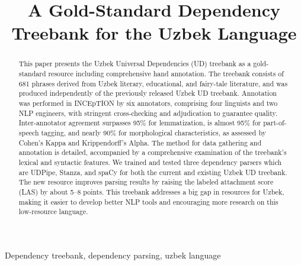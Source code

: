 \documentclass[10pt,conference,a4paper]{IEEEtran_EDM}
\def\confheader{}
\begin{document}
\markboth{\confheader}{}
\title{A Gold-Standard Dependency Treebank for the Uzbek Language}

\author{
\and
{}
}

\maketitle
\thispagestyle{plain}
\pagestyle{plain}

\begin{abstract}
 This paper presents the Uzbek Universal Dependencies (UD) treebank as a gold-standard resource including comprehensive hand annotation. The treebank consists of 681 phrases derived from Uzbek literary, educational, and fairy-tale literature, and was produced independently of the previously released Uzbek UD treebank. Annotation was performed in INCEpTION by six annotators, comprising four linguists and two NLP engineers, with stringent cross-checking and adjudication to guarantee quality. Inter-annotator agreement surpasses 95\% for lemmatization, is almost 95\% for part-of-speech tagging, and nearly 90\% for morphological characteristics, as assessed by Cohen's Kappa and Krippendorff's Alpha. The method for data gathering and annotation is detailed, accompanied by a comprehensive examination of the treebank's lexical and syntactic features. We trained and tested three dependency parsers which are UDPipe, Stanza, and spaCy for both the current and existing Uzbek UD treebank. The new resource improves parsing results by raising the labeled attachment score (LAS) by about 5–8 points. This treebank addresses a big gap in resources for Uzbek, making it easier to develop better NLP tools and encouraging more research on this low-resource language.
\end{abstract}

\begin{IEEEkeywords}
Dependency treebank, dependency parsing, uzbek language
\end{IEEEkeywords}
\end{document}
